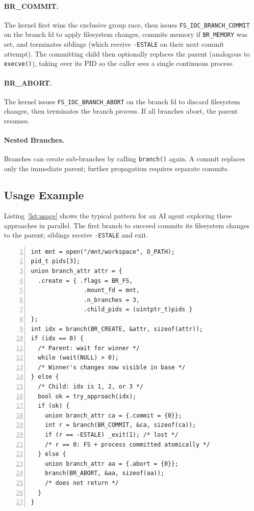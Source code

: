 \documentclass[sigconf]{acmart}
\newcommand{\syscall}{\texttt{branch()}\xspace}
\begin{document}
\paragraph{BR\_COMMIT.}
The kernel first wins the exclusive group race, then issues \texttt{FS\_IOC\_BRANCH\_COMMIT} on the branch fd to apply filesystem changes, commits memory if \texttt{BR\_MEMORY} was set, and terminates siblings (which receive \texttt{-ESTALE} on their next commit attempt). The committing child then optionally replaces the parent (analogous to \texttt{execve()}), taking over its PID so the caller sees a single continuous process.

\paragraph{BR\_ABORT.}
The kernel issues \texttt{FS\_IOC\_BRANCH\_ABORT} on the branch fd to discard filesystem changes, then terminates the branch process. If all branches abort, the parent resumes.

\paragraph{Nested Branches.}
Branches can create sub-branches by calling \syscall again. A commit replaces only the immediate parent; further propagation requires separate commits.

\subsection{Usage Example}

Listing~\ref{lst:usage} shows the typical pattern for an AI agent exploring three approaches in parallel. The first branch to succeed commits its filesystem changes to the parent; siblings receive \texttt{-ESTALE} and exit.

\begin{lstlisting}[caption={Parallel exploration with first-commit-wins.},label={lst:usage},numbers=left,xleftmargin=2em,float=tp]
int mnt = open("/mnt/workspace", O_PATH);
pid_t pids[3];
union branch_attr attr = {
  .create = { .flags = BR_FS,
               .mount_fd = mnt,
               .n_branches = 3,
               .child_pids = (uintptr_t)pids }
};
int idx = branch(BR_CREATE, &attr, sizeof(attr));
if (idx == 0) {
  /* Parent: wait for winner */
  while (wait(NULL) > 0);
  /* Winner's changes now visible in base */
} else {
  /* Child: idx is 1, 2, or 3 */
  bool ok = try_approach(idx);
  if (ok) {
    union branch_attr ca = {.commit = {0}};
    int r = branch(BR_COMMIT, &ca, sizeof(ca));
    if (r == -ESTALE) _exit(1); /* lost */
    /* r == 0: FS + process committed atomically */
  } else {
    union branch_attr aa = {.abort = {0}};
    branch(BR_ABORT, &aa, sizeof(aa));
    /* does not return */
  }
}
\end{lstlisting}
\end{document}
